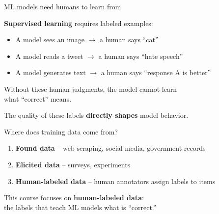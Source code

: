 \documentclass[aspectratio=169,11pt]{beamer}
\begin{document}
\begin{frame}{ML models need humans to learn from}

\textbf{Supervised learning} requires labeled examples:
\begin{itemize}
  \item A model sees an image $\to$ a human says ``cat''
  \item A model reads a tweet $\to$ a human says ``hate speech''
  \item A model generates text $\to$ a human says ``response A is better''
\end{itemize}

\vspace{1em}

Without these human judgments, the model cannot learn\\
what ``correct'' means.

\vspace{1em}

The quality of these labels \textbf{directly shapes} model behavior.
\end{frame}

\begin{frame}{Where does training data come from?}
\begin{enumerate}
  \item \textbf{Found data} -- web scraping, social media, government records
  \item \textbf{Elicited data} -- surveys, experiments
  \item \textbf{Human-labeled data} -- human annotators assign labels to items
\end{enumerate}

\vspace{1em}

This course focuses on \textbf{human-labeled data}:\\
the labels that teach ML models what is ``correct.''
\end{frame}
\end{document}
